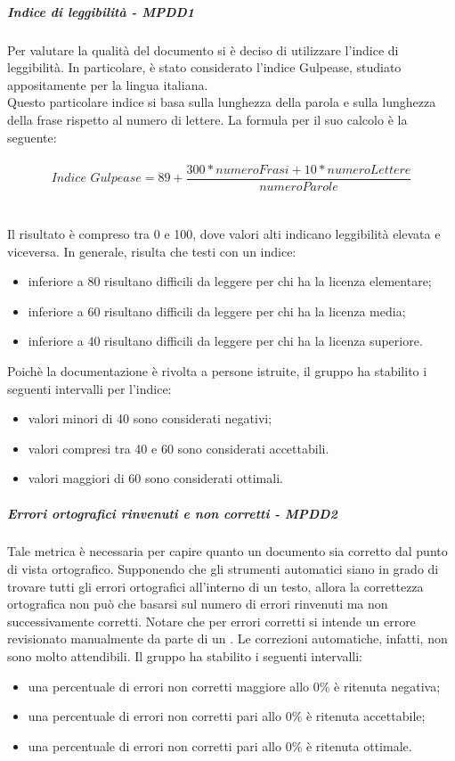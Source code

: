 \documentclass[PianoDiQualifica.tex]{subfiles}
\begin{document}
				\hypertarget{leggi_m}{\subparagraph{Indice di leggibilità - MPDD1}}
				Per valutare la qualità del documento si è deciso di utilizzare l'indice di leggibilità.
				In particolare, è stato considerato l’indice Gulpease, studiato appositamente per la lingua italiana. \\
				Questo particolare indice si basa sulla lunghezza della parola e sulla lunghezza della frase rispetto al numero di lettere. La formula per il suo calcolo è la seguente: \\ \\
				\begin{equation}\textit{Indice Gulpease} = 89 + \frac{300 * \textit{numeroFrasi} + 10 * \textit{numeroLettere}}{\textit{numeroParole}}\end{equation} \\ \\
				Il risultato è compreso tra 0 e 100, dove valori alti indicano leggibilità elevata e viceversa.
				In generale, risulta che testi con un indice:
				\begin{itemize}
					\item inferiore a 80 risultano difficili da leggere per chi ha la licenza elementare;
					\item inferiore a 60 risultano difficili da leggere per chi ha la licenza media;
					\item inferiore a 40 risultano difficili da leggere per chi ha la licenza superiore.
				\end{itemize}
				Poichè la documentazione è rivolta a persone istruite, il gruppo ha stabilito i seguenti intervalli per l'indice:
				\begin{itemize}
					\item valori minori di 40 sono considerati negativi;
					\item valori compresi tra 40 e 60 sono considerati accettabili.
					\item valori maggiori di 60 sono considerati ottimali.
				\end{itemize}
				
				\hypertarget{err_ortografici}{\subparagraph{Errori ortografici rinvenuti e non corretti - MPDD2}}
				Tale metrica è necessaria per capire quanto un documento sia corretto dal punto di vista ortografico. Supponendo che gli strumenti automatici
				siano in grado di trovare tutti gli errori ortografici all’interno di un testo, allora la correttezza ortografica non può che basarsi
				sul numero di errori rinvenuti ma non successivamente corretti. Notare che per errori corretti si intende un errore revisionato manualmente da parte
				di un \VER{}. Le correzioni automatiche, infatti, non sono molto attendibili.
				Il gruppo ha stabilito i seguenti intervalli:
				\begin{itemize}
					\item una percentuale di errori non corretti maggiore allo 0\% è ritenuta negativa;
					\item una percentuale di errori non corretti pari allo 0\% è ritenuta accettabile;
					\item una percentuale di errori non corretti pari allo 0\% è ritenuta ottimale.
				\end{itemize}
				
\end{document}
